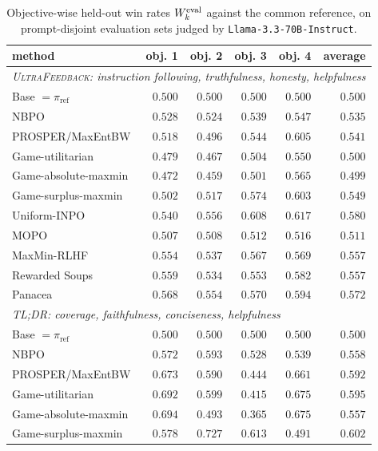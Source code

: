 \documentclass{article}
\theoremstyle{remark}
\theoremstyle{plain}
\newcommand{\piref}{\pi_{\mathrm{ref}}}
\newcommand{\NBPO}{\textsc{NBPO}}
\begin{document}
\begin{table}[t]
\centering\scriptsize
\setlength{\tabcolsep}{2.5pt}
\caption{Objective-wise held-out win rates $W_k^{\rm eval}$ against the common reference, on prompt-disjoint evaluation sets judged by \texttt{Llama-3.3-70B-Instruct}.}
\label{tab:neutral-objectivewise}
\begin{tabular}{lrrrrr}
\toprule
method & obj. 1 & obj. 2 & obj. 3 & obj. 4 & average\\
\midrule
\multicolumn{6}{l}{\textit{\textsc{UltraFeedback}: instruction following, truthfulness, honesty, helpfulness}}\\
Base $=\piref$ & $0.500$ & $0.500$ & $0.500$ & $0.500$ & $0.500$\\
\NBPO{} & $0.528$ & $0.524$ & $0.539$ & $0.547$ & $0.535$\\
PROSPER/MaxEntBW & $0.518$ & $0.496$ & $0.544$ & $0.605$ & $0.541$\\
Game-utilitarian & $0.479$ & $0.467$ & $0.504$ & $0.550$ & $0.500$\\
Game-absolute-maxmin & $0.472$ & $0.459$ & $0.501$ & $0.565$ & $0.499$\\
Game-surplus-maxmin & $0.502$ & $0.517$ & $0.574$ & $0.603$ & $0.549$\\
Uniform-INPO & $0.540$ & $0.556$ & $0.608$ & $0.617$ & $0.580$\\
MOPO & $0.507$ & $0.508$ & $0.512$ & $0.516$ & $0.511$\\
MaxMin-RLHF & $0.554$ & $0.537$ & $0.567$ & $0.569$ & $0.557$\\
Rewarded Soups & $0.559$ & $0.534$ & $0.553$ & $0.582$ & $0.557$\\
Panacea & $0.568$ & $0.554$ & $0.570$ & $0.594$ & $0.572$\\
\midrule
\multicolumn{6}{l}{\textit{\textsc{TL;DR}: coverage, faithfulness, conciseness, helpfulness}}\\
Base $=\piref$ & $0.500$ & $0.500$ & $0.500$ & $0.500$ & $0.500$\\
\NBPO{} & $0.572$ & $0.593$ & $0.528$ & $0.539$ & $0.558$\\
PROSPER/MaxEntBW & $0.673$ & $0.590$ & $0.444$ & $0.661$ & $0.592$\\
Game-utilitarian & $0.692$ & $0.599$ & $0.415$ & $0.675$ & $0.595$\\
Game-absolute-maxmin & $0.694$ & $0.493$ & $0.365$ & $0.675$ & $0.557$\\
Game-surplus-maxmin & $0.578$ & $0.727$ & $0.613$ & $0.491$ & $0.602$\\

\end{tabular}
\end{table}
\end{document}
